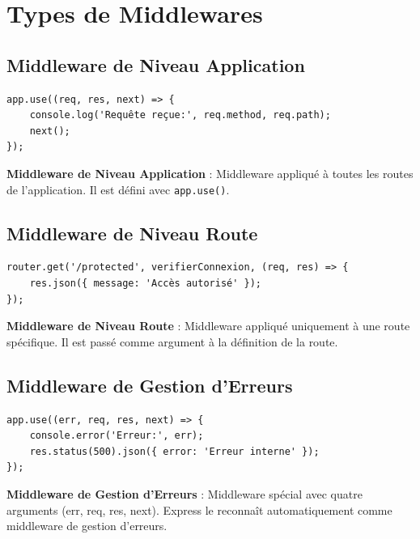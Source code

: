 \section{Types de Middlewares}

\subsection{Middleware de Niveau Application}

\begin{lstlisting}[style=javascript, caption=Middleware de niveau application]
app.use((req, res, next) => {
    console.log('Requête reçue:', req.method, req.path);
    next();
});
\end{lstlisting}

\begin{definitionbox}
    \textbf{Middleware de Niveau Application} : Middleware appliqué à toutes les routes de l'application. Il est défini avec \texttt{app.use()}.
\end{definitionbox}

\subsection{Middleware de Niveau Route}

\begin{lstlisting}[style=javascript, caption=Middleware de niveau route]
router.get('/protected', verifierConnexion, (req, res) => {
    res.json({ message: 'Accès autorisé' });
});
\end{lstlisting}

\begin{definitionbox}
    \textbf{Middleware de Niveau Route} : Middleware appliqué uniquement à une route spécifique. Il est passé comme argument à la définition de la route.
\end{definitionbox}

\subsection{Middleware de Gestion d'Erreurs}

\begin{lstlisting}[style=javascript, caption=Middleware de gestion d'erreurs]
app.use((err, req, res, next) => {
    console.error('Erreur:', err);
    res.status(500).json({ error: 'Erreur interne' });
});
\end{lstlisting}

\begin{definitionbox}
    \textbf{Middleware de Gestion d'Erreurs} : Middleware spécial avec quatre arguments (err, req, res, next). Express le reconnaît automatiquement comme middleware de gestion d'erreurs.
\end{definitionbox}


